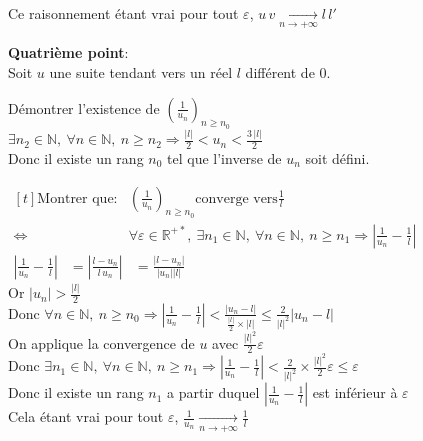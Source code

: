 \documentclass[12pt,twoside,a4paper]{article}
\begin{document}
\begin{preuve}
\begin{liste}
					Ce raisonnement étant vrai pour tout $\varepsilon$, $u\,v\mathop{\longrightarrow}\limits_{n\rightarrow+\infty}l\,l'$
				\item\textbf{Quatrième point}:\\
					Soit $u$ une suite tendant vers un réel $l$ différent de 0.\\
					\begin{liste}
						\item Démontrer l'existence de $\left(\frac{1}{u_n}\right)_{n\geqslant n_0}$\\
							$\exists n_2\in\mathbb{N},\ \forall n\in\mathbb{N},\ n\geqslant n_2\Rightarrow \frac{|l|}{2}<u_n<\frac{3\,|l|}{2}$\\
							Donc il existe un rang $n_0$ tel que l'inverse de $u_n$ soit défini.
						\item $\begin{aligned}[t]\text{Montrer que:}&\left(\frac{1}{u_n}\right)_{n\geqslant n_0}\text{converge vers}\frac{1}{l}\\
								\iff&\forall\varepsilon\in\mathbb{R}^{+*},\ \exists n_1\in\mathbb{N},\ \forall n\in\mathbb{N},\ n\geqslant n_1\Rightarrow\left|\frac{1}{u_n}-\frac{1}{l}\right|\end{aligned}$
							$\begin{aligned}\left|\frac{1}{u_n}-\frac{1}{l}\right|&=\left|\frac{l-u_n}{l\,u_n}\right|
								&=\frac{\left| l-u_n\right|}{\left| u_n\right| \left| l\right| }\end{aligned}$\\
							Or $\left| u_n\right| >\frac{\left| l\right| }{2}$\\
							Donc $\forall n\in\mathbb{N},\ n\geqslant n_0\Rightarrow\left|\frac{1}{u_n}-\frac{1}{l}\right|<\frac{\left| u_n-l\right| }{\frac{\left| l\right| }{2}\times\left| l\right| }\leqslant \frac{2}{\left| l\right| ^2}\left| u_n-l\right|$\\
							On applique la convergence de $u$ avec $\frac{\left| l\right| ^2}{2}\varepsilon$\\
							Donc $\exists n_1\in\mathbb{N},\ \forall n\in\mathbb{N},\ n\geqslant n_1\Rightarrow\left|\frac{1}{u_n}-\frac{1}{l}\right|< \frac{2}{\left| l\right| ^2}\times\frac{\left| l\right| ^2}{2}\varepsilon \leqslant \varepsilon$\\
							Donc il existe un rang $n_1$ a partir duquel $\left|\frac{1}{u_n}-\frac{1}{l}\right|$ est inférieur \`a $\varepsilon$\\
							Cela étant vrai pour tout $\varepsilon$, $\frac{1}{u_n}\mathop{\longrightarrow}\limits_{n\rightarrow+\infty}\frac{1}{l}$
					\end{liste}
			\end{liste}
		\end{preuve}
\end{document}

